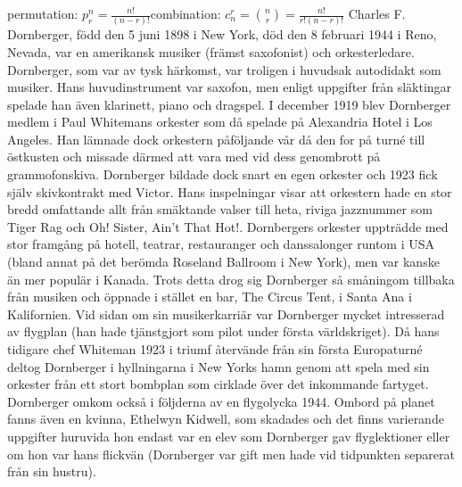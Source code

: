 \documentclass{article}
\begin{document}
\begin{multicols}{3}
permutation: $p_{r}^{n}=\frac{n!}{(n-r)!}$combination: $c_{n}^{r}=\binom{n}{r}=\frac{n!}{r!(n-r)!}$
Charles F. Dornberger, född den 5 juni 1898 i New York, död den 8 februari 1944 i Reno, Nevada, var en amerikansk musiker (främst saxofonist) och orkesterledare.
Dornberger, som var av tysk härkomst, var troligen i huvudsak autodidakt som musiker. Hans huvudinstrument var saxofon, men enligt uppgifter från släktingar spelade han även klarinett, piano och dragspel.
I december 1919 blev Dornberger medlem i Paul Whitemans orkester som då spelade på Alexandria Hotel i Los Angeles. Han lämnade dock orkestern påföljande vår då den for på turné till östkusten och missade därmed att vara med vid dess genombrott på grammofonskiva. Dornberger bildade dock snart en egen orkester och 1923 fick själv skivkontrakt med Victor. Hans inspelningar visar att orkestern hade en stor bredd omfattande allt från smäktande valser till heta, riviga jazznummer som Tiger Rag och Oh! Sister, Ain't That Hot!.
Dornbergers orkester uppträdde med stor framgång på hotell, teatrar, restauranger och danssalonger runtom i USA (bland annat på det berömda Roseland Ballroom i New York), men var kanske än mer populär i Kanada. Trots detta drog sig Dornberger så småningom tillbaka från musiken och öppnade i stället en bar, The Circus Tent, i Santa Ana i Kalifornien.
Vid sidan om sin musikerkarriär var Dornberger mycket intresserad av flygplan (han hade tjänstgjort som pilot under första världskriget). Då hans tidigare chef Whiteman 1923 i triumf återvände från sin första Europaturné deltog Dornberger i hyllningarna i New Yorks hamn genom att spela med sin orkester från ett stort bombplan som cirklade över det inkommande fartyget. Dornberger omkom också i följderna av en flygolycka 1944. Ombord på planet fanns även en kvinna, Ethelwyn Kidwell, som skadades och det finns varierande uppgifter huruvida hon endast var en elev som Dornberger gav flyglektioner eller om hon var hans flickvän (Dornberger var gift men hade vid tidpunkten separerat från sin hustru).
\end{multicols}
 
\end{document}
